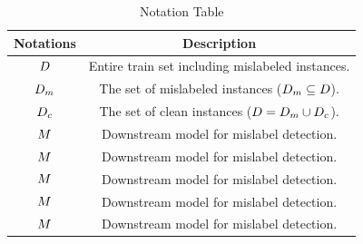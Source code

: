 \begin{table}
	\centering
	\caption{Notation Table}
	{
		\begin{tabular}{|c|c|}
			\hline
			{\bf Notations} & {\bf Description}  \\
			\hline	
			$D$ & Entire train set including mislabeled instances. \\\hline
			$D_m$ & The set of mislabeled instances ($D_m \subseteq D$).   \\\hline			
			$D_c$ & The set of clean instances ($ D = D_m \cup D_c $).  \\\hline
			$M$ & Downstream model for mislabel detection.   \\\hline
			$M$ & Downstream model for mislabel detection.   \\\hline
			$M$ & Downstream model for mislabel detection.   \\\hline
			$M$ & Downstream model for mislabel detection.   \\\hline
			$M$ & Downstream model for mislabel detection.   \\\hline	
		\end{tabular}
	}
	\label{tbl:notation}

\end{table}



